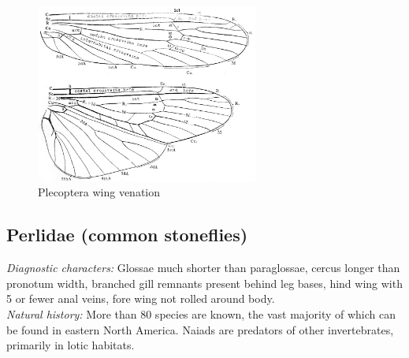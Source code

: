 \documentclass[letterpaper, 11pt]{article}
\begin{document}
\begin{figure}[ht!]
  \centering
    \includegraphics[width=0.65\textwidth]{PlecopteraWings}
  \caption{Plecoptera wing venation \citep[modified from][Fig. 1]{bhl29875}}
  \label{fig:plecowings}
\end{figure}

\subsection{Perlidae (common stoneflies)}
\noindent{}\textit{Diagnostic characters:} Glossae much shorter than paraglossae, cercus longer than pronotum width, branched gill remnants present behind leg bases, hind wing with 5 or fewer anal veins, fore wing not rolled around body.\\

\noindent{}\textit{Natural history:} More than 80 species are known, the vast majority of which can be found in eastern North America. Naiads are predators of other invertebrates, primarily in lotic habitats.\\ 
\end{document}

